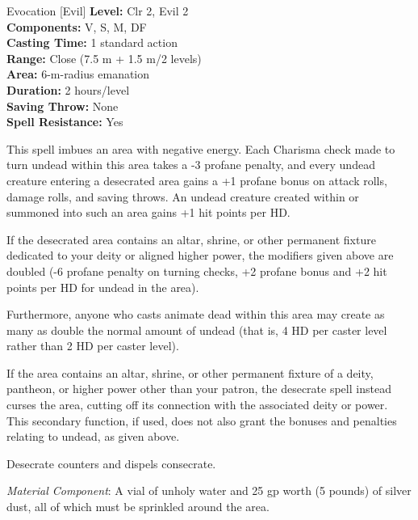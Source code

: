 {Evocation [Evil]}
{
	\textbf{Level:}
	Clr 2, Evil 2\\
	\textbf{Components:}
	V, S, M, DF\\
	\textbf{Casting Time:}
	1 standard action\\
	\textbf{Range:}
	Close (7.5 m + 1.5 m/2 levels)\\
	\textbf{Area:}
	6-m-radius emanation\\
	\textbf{Duration:}
	2 hours/level\\
	\textbf{Saving Throw:}
	None\\
	\textbf{Spell Resistance:}
	Yes\\
}
{
	This spell imbues an area with negative energy. Each Charisma check made to turn undead within this area takes a -3 profane penalty, and every undead creature entering a desecrated area gains a +1 profane bonus on attack rolls, damage rolls, and saving throws. An undead creature created within or summoned into such an area gains +1 hit points per HD.

	If the desecrated area contains an altar, shrine, or other permanent fixture dedicated to your deity or aligned higher power, the modifiers given above are doubled (-6 profane penalty on turning checks, +2 profane bonus and +2 hit points per HD for undead in the area).

	Furthermore, anyone who casts animate dead within this area may create as many as double the normal amount of undead (that is, 4 HD per caster level rather than 2 HD per caster level).

	If the area contains an altar, shrine, or other permanent fixture of a deity, pantheon, or higher power other than your patron, the desecrate spell instead curses the area, cutting off its connection with the associated deity or power. This secondary function, if used, does not also grant the bonuses and penalties relating to undead, as given above.

	Desecrate counters and dispels consecrate.

	\textit{Material Component}:
	A vial of unholy water and 25 gp worth (5 pounds) of silver dust, all of which must be sprinkled around the area.

}
